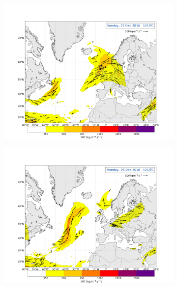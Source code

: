 \begin{figure}[t!]
	\begin{subfigure}[b]{0.49\textwidth}
		\includegraphics[trim={4.2cm 3.9cm 4.3cm 5.1cm},clip,
		width=\textwidth]{./fig_Atm_Riv/20161225_12}
		\caption{}\label{fig:AR25}
	\end{subfigure}
	\begin{subfigure}[b]{0.49\textwidth}
		\includegraphics[trim={4.2cm 3.9cm 4.3cm 5.1cm},clip,
		width=\textwidth]{./fig_Atm_Riv/20161226_12}
		\caption{}\label{fig:AR26}
	\end{subfigure}
	\begin{subfigure}[b]{\textwidth}

\end{subfigure}
\end{figure}
